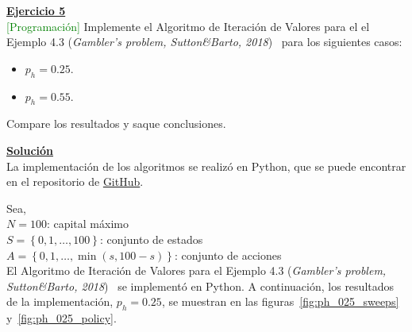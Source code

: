 \indent\underline{\textbf{Ejercicio 5}}\\
\textcolor{green}{[Programación]} Implemente el Algoritmo de Iteración de Valores para el el Ejemplo 4.3 (\textit{Gambler’s problem, Sutton\&Barto, 2018})~\cite{Sutton2018} para los siguientes casos:

\begin{itemize}
    \item $p_h = 0.25$.
    \item $p_h = 0.55$.
\end{itemize}

Compare los resultados y saque conclusiones.

\indent\underline{\textbf{Solución}}\\
La implementación de los algoritmos se realizó en Python, que se puede encontrar en el repositorio de \href{https://github.com/MasterUBA-DM-KD/Aprendizaje_Reforzado/blob/5ae50da937b14f0a11c416e40019a4b5661dd51b/docs/guia/3/notebooks/utils.py}{GitHub}.

Sea,\\
$N=100$: capital máximo\\
$S=\left\{0, 1, \ldots, 100\right\}$: conjunto de estados\\
$A=\left\{0, 1, \ldots, \min(s, 100-s)\right\}$: conjunto de acciones\\

El Algoritmo de Iteración de Valores para el Ejemplo 4.3 (\textit{Gambler’s problem, Sutton\&Barto, 2018})~\cite{Sutton2018} se implementó en Python\footnotemark.
A continuación, los resultados de la implementación, $p_h = 0.25$, se muestran en las figuras~\ref{fig:ph_025_sweeps} y~\ref{fig:ph_025_policy}.


